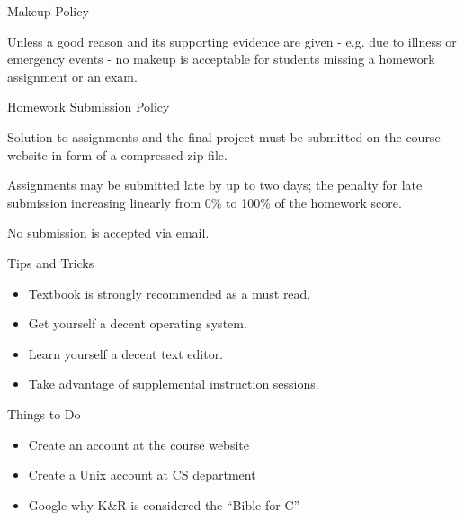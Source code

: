 \documentclass[compress]{beamer}
\begin{document}
\begin{slide}
	\begin{block}{Makeup Policy}

	Unless a good reason and its supporting evidence are given - e.g. due to illness or emergency events - no makeup is acceptable for students missing a homework assignment or an exam.

	\end{block}
\end{slide}

\begin{slide}
	\begin{block}{Homework Submission Policy}

	Solution to assignments and the final project must be submitted on the course website in form of a compressed zip file.

	Assignments may be submitted late by up to two days; the penalty for late submission increasing linearly from 0\% to 100\% of the homework score.

	No submission is accepted via email.

	\end{block}
\end{slide}

\begin{slide}
	\begin{block}{Tips and Tricks}

	\begin{itemize}
	\item[] Textbook is strongly recommended as a must read.
	\item[] Get yourself a decent operating system.
	\item[] Learn yourself a decent text editor.
	\item[] Take advantage of supplemental instruction sessions.
	\end{itemize}

	\end{block}
\end{slide}

\begin{slide}
	\begin{block}{Things to Do}

	\begin{itemize}
	\item[] Create an account at the course website
	\item[] Create a Unix account at CS department
	\item[] Google why K\&R is considered the ``Bible for C''
	\end{itemize}

	\end{block}
\end{slide}
\end{document}
